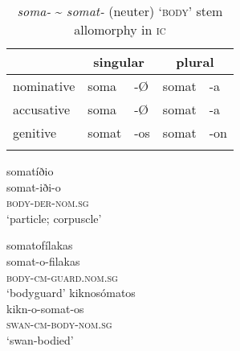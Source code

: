 \documentclass[output=paper]{LSP/langsci}
\begin{document}
\begin{table}
\caption{\textit{soma-} {\textasciitilde} \textit{somat-} (neuter) `\textsc{body}' stem allomorphy in \textsc{ic}}
\label{table2}
\begin{tabularx}{.75\textwidth}{Xllll}
 \lsptoprule
           & \multicolumn{2}{c}{singular} & \multicolumn{2}{c}{plural} \\
\midrule
{nominative} & soma           & -\O         & somat         & -a         \\
{accusative} & soma           & -\O         & somat         & -a         \\
{genitive}   & somat          & -os         & somat         & -on        \\
\lspbottomrule      
\end{tabularx}
\end{table}

\ea\label{ex:8}
	\ea\label{ex:8a}
		\glll 	somatíðio\\
				somat-iði-o\\
				\textsc{body}-\textsc{der}-\textsc{nom.sg}\\
		\glt	`particle; corpuscle'
\begin{multicols}{2}
	\ex\label{ex:8b}
		\glll	somatofílakas\\
				somat-o-filakas\\
				\textsc{body-cm-guard.nom.sg}\\
		\glt	`bodyguard'
	\ex\label{ex:8c}
		\glll	kiknosómatos\\
				kikn-o-somat-os\\
				\textsc{swan-cm-body-nom.sg}\\
		\glt	`swan-bodied'
\end{multicols}
	\z
\z
\end{document}
